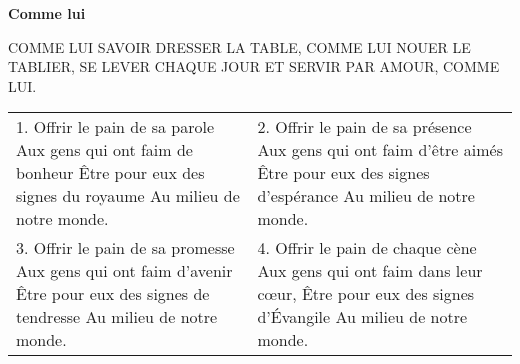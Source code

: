 \textbf{Comme lui}

COMME LUI SAVOIR DRESSER LA TABLE,
COMME LUI NOUER LE TABLIER,
SE LEVER CHAQUE JOUR
ET SERVIR PAR AMOUR, COMME LUI.

\begin{tabular}{p{} p{}}
1.
Offrir le pain de sa parole \newline
Aux gens qui ont faim de bonheur \newline
Être pour eux des signes du royaume \newline
Au milieu de notre monde.
&
2.
Offrir le pain de sa présence \newline
Aux gens qui ont faim d’être aimés \newline
Être pour eux des signes d’espérance \newline
Au milieu de notre monde.
\\
3.
Offrir le pain de sa promesse \newline
Aux gens qui ont faim d’avenir \newline
Être pour eux des signes de tendresse \newline
Au milieu de notre monde.
&
4.
Offrir le pain de chaque cène \newline
Aux gens qui ont faim dans leur cœur, \newline
Être pour eux des signes d’Évangile \newline
Au milieu de notre monde.
\end{tabular}
